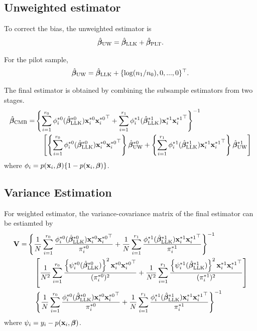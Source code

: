 \documentclass[letterpaper,12pt,hidelinks]{article}
\begin{document}
\subsection{Unweighted estimator}

To correct the bias, the unweighted estimator is 
\begin{align*}
    \hat{\boldsymbol{\beta}}_{\mathrm{UW}} = \hat{\boldsymbol{\beta}}_{\mathrm{LLK}} + \hat{\boldsymbol{\beta}}_{\mathrm{PLT}}.
\end{align*}

For the pilot sample, 
\begin{align*}
    \hat{\boldsymbol{\beta}}_{\mathrm{UW}} = \hat{\boldsymbol{\beta}}_{\mathrm{LLK}} + \{\log(n_1/n_0), 0, ..., 0\}^{\top}.
\end{align*}

The final estimator is obtained by combining the subsample estimators from two 
stages.
\begin{align*}
    \hat{\boldsymbol{\beta}}_{\mathrm{CMB}} = &\left\{\sum_{i=1}^{r_0} \phi_i^{*0}(\hat{\boldsymbol{\beta}}_{\mathrm{LLK}}^{*0}) \mathbf{x}_i^{*0} {\mathbf{x}_i^{*0}}^{\top} + \sum_{i=1}^{r_1} \phi_i^{*1}(\hat{\boldsymbol{\beta}}_{\mathrm{LLK}}^{*1}) \mathbf{x}_i^{*1} {\mathbf{x}_i^{*1}}^{\top}\right\}^{-1}\\
    &\quad \left[ \left\{\sum_{i=1}^{r_0} \phi_i^{*0}(\hat{\boldsymbol{\beta}}_{\mathrm{LLK}}^{*0}) \mathbf{x}_i^{*0} {\mathbf{x}_i^{*0}}^{\top}\right\}\hat{\boldsymbol{\beta}}_{\mathrm{UW}}^{*0} + \left\{\sum_{i=1}^{r_1} \phi_i^{*1}(\hat{\boldsymbol{\beta}}_{\mathrm{LLK}}^{*1}) \mathbf{x}_i^{*1} {\mathbf{x}_i^{*1}}^{\top}\right\}\hat{\boldsymbol{\beta}}_{\mathrm{UW}}^{*1} \right]
\end{align*}
where $\phi_i = p(\mathbf{x}_i, \boldsymbol{\beta})\{ 1 - p(\mathbf{x}_i, \boldsymbol{\beta})\}$.


\subsection{Variance Estimation}

For weighted estimator, the variance-covariance matrix of the final estimator can be estiamted by
\begin{align*}
    \mathbf{V} = &\left\{\frac{1}{N}\sum_{i=1}^{r_0} \frac{\phi_i^{*0}(\hat{\boldsymbol{\beta}}_{\mathrm{LLK}}^{*0}) \mathbf{x}_i^{*0} {\mathbf{x}_i^{*0}}^{\top}}{\pi_i^{*0}} + \frac{1}{N}\sum_{i=1}^{r_1} \frac{\phi_i^{*1}(\hat{\boldsymbol{\beta}}_{\mathrm{LLK}}^{*1}) \mathbf{x}_i^{*1} {\mathbf{x}_i^{*1}}^{\top}}{\pi_i^{*1}}\right\}^{-1}\\
    &\quad \left[\frac{1}{N^2} \sum_{i=1}^{r_0} \frac{\left\{\psi_i^{*0}(\hat{\boldsymbol{\beta}}_{\mathrm{LLK}}^{*0}) \right\}^2 \mathbf{x}_i^{*0} {\mathbf{x}_i^{*0}}^{\top}}{(\pi_i^{*0})^2} + \frac{1}{N^2}\sum_{i=1}^{r_1} \frac{\left\{\psi_i^{*1}(\hat{\boldsymbol{\beta}}_{\mathrm{LLK}}^{*1})\right\}^2 \mathbf{x}_i^{*1} {\mathbf{x}_i^{*1}}^{\top}}{(\pi_i^{*1})^2} \right]\\
    &\quad\left\{\frac{1}{N}\sum_{i=1}^{r_0} \frac{\phi_i^{*0}(\hat{\boldsymbol{\beta}}_{\mathrm{LLK}}^{*0}) \mathbf{x}_i^{*0} {\mathbf{x}_i^{*0}}^{\top}}{\pi_i^{*0}} + \frac{1}{N}\sum_{i=1}^{r_1} \frac{\phi_i^{*1}(\hat{\boldsymbol{\beta}}_{\mathrm{LLK}}^{*1}) \mathbf{x}_i^{*1} {\mathbf{x}_i^{*1}}^{\top}}{\pi_i^{*1}}\right\}^{-1}
\end{align*}
where $\psi_i = y_i - p(\mathbf{x}_i, \boldsymbol{\beta})$.
\end{document}
